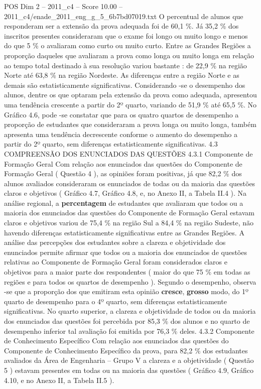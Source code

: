 \begin{textsample}{POS Dim 2 – 2011\_c4 – Score 10.00 – 2011\_c4/enade\_2011\_eng\_g\_5\_6b7bd07019.txt}
O percentual de alunos que responderam ser a extensão da prova adequada foi de 60,1 \%.
Já 35,2 \% dos inscritos presentes consideraram que o exame foi longo ou muito longo e menos do que 5 \% o avaliaram como curto ou muito curto.
Entre as Grandes Regiões a proporção daqueles que avaliaram a prova como longa ou muito longa em relação ao tempo total destinado à sua resolução variou bastante : de 22,9 \% na região Norte até 63,8 \% na região Nordeste.
As diferenças entre a região Norte e as demais são estatisticamente significativas.
Considerando -se o desempenho dos alunos, dentre os que optaram pela extensão da prova como adequada, apresentou uma tendência crescente a partir do 2º quarto, variando de 51,9 \% até 65,5 \%.
No Gráfico 4.6, pode -se constatar que para os quatro quartos de desempenho a proporção de estudantes que consideraram a prova longa ou muito longa, também apresenta uma tendência decrescente conforme o aumento do desempenho a partir do 2º quarto, sem diferenças estatisticamente significativas. 4.3 COMPREENSÃO DOS ENUNCIADOS DAS QUESTÕES 4.3.1 Componente de Formação Geral Com relação aos enunciados das questões do Componente de Formação Geral ( Questão 4 ), as opiniões foram positivas, já que 82,2 \% dos alunos avaliados consideraram os enunciados de todas ou da maioria das questões claros e objetivos ( Gráfico 4.7, Gráfico 4.8, e, no Anexo II, a Tabela II.4 ).
Na análise regional, a \textbf{percentagem} de estudantes que avaliaram que todos ou a maioria dos enunciados das questões do Componente de Formação Geral estavam claros e objetivos variou de 75,4 \% na região Sul a 84,4 \% na região Sudeste, não havendo diferenças estatisticamente significativas entre as Grandes Regiões.
A análise das percepções dos estudantes sobre a clareza e objetividade dos enunciados permite afirmar que todos ou a maioria dos enunciados de questões relativas ao Componente de Formação Geral foram considerados claros e objetivos para a maior parte dos respondentes ( maior do que 75 \% em todas as regiões e para todos os quartos de desempenho ).
Segundo o desempenho, observa -se que a proporção dos que emitiram esta opinião \textbf{cresce}, \textbf{grosso} modo, do 1º quarto de desempenho para o 4º quarto, sem diferenças estatisticamente significativas.
No quarto superior, a clareza e objetividade de todos ou da maioria dos enunciados das questões foi percebida por 85,3 \% dos alunos e no quarto de desempenho inferior tal avaliação foi emitida por 76,3 \% deles. 4.3.2 Componente de Conhecimento Específico Com relação aos enunciados das questões do Componente de Conhecimento Específico da prova, para 82,2 \% dos estudantes avaliados da Área de Engenharia – Grupo V a clareza e a objetividade ( Questão 5 ) estavam presentes em todas ou na maioria das questões ( Gráfico 4.9, Gráfico 4.10, e no Anexo II, a Tabela II.5 ).

\end{textsample}
